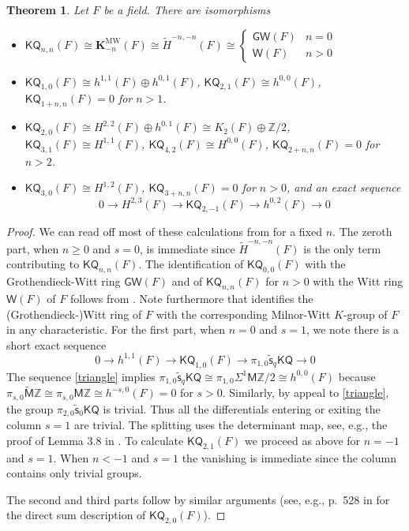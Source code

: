 \documentclass[11pt,hyp,english]{article}
\newcommand{\Z}{\mathbb{Z}}
\newcommand{\KQ}{\mathsf{KQ}}
\newcommand{\GW}{\mathsf{GW}}
\newcommand{\HZ}{\mathsf{M}\Z}
\newcommand{\cHZ}{\wt{{\mathsf{M}}}{\Z}}
\newcommand{\wt}[1]{\widetilde{#1}}
\newcommand{\vs}{\tilde{\mathsf{s}}}
\newcommand{\KMW}{\mathbf{K}^\mathrm{MW}}
\newtheorem{theorem}{Theorem}[section]
\theoremstyle{definition}
\begin{document}
\begin{theorem}\label{thm:KQ-coeff-field}
Let $F$ be a field. 
There are isomorphisms 
\begin{itemize}
\item[0.] 
$\KQ_{n,n}(F)\cong \KMW_{-n}(F) 
\cong
\widetilde{H}^{-n,-n}(F)
\cong
\begin{cases}
\GW(F) & n=0  \\
\mathsf{W}(F) & n>0
\end{cases}
$ 
\item[1.] 
$
\KQ_{1,0}(F)\cong 
h^{1,1}(F)\oplus h^{0,1}(F)
$, 
$
\KQ_{2,1}(F)\cong 
h^{0,0}(F)
$,
$
\KQ_{1+n,n}(F)=
0
$
for $n>1$.
\item[2.] 
$
\KQ_{2,0}(F)\cong 
H^{2,2}(F)\oplus h^{0,1}(F)
\cong
K_{2}(F) \oplus \mathbb{Z}/2
$, 
$
\KQ_{3,1}(F)\cong 
H^{1,1}(F)
$,
$
\KQ_{4,2}(F)\cong 
H^{0,0}(F)
$,
$
\KQ_{2+n,n}(F)=
0
$
for $n>2$.
\item[3.] 
$
\KQ_{3,0}(F)\cong 
H^{1,2}(F)
$,
$
\KQ_{3+n,n}(F)=
0
$
for $n>0$, and an exact sequence
$$
0\to
H^{2,3}(F)
\to
\KQ_{2,-1}(F)
\to
h^{0,2}(F)
\to 0
$$
\end{itemize}
\end{theorem}
\begin{proof}
We can read off most of these calculations from  for a fixed $n$. 
The zeroth part, when $n\geq 0$ and $s=0$, is immediate since $\widetilde{H}^{-n,-n}(F)$ is the only term contributing to $\KQ_{n,n}(F)$.
The identification of $\KQ_{0,0}(F)$ with the Grothendieck-Witt ring $\GW(F)$ and of $\KQ_{n,n}(F)$ for $n>0$ with the Witt ring $\mathsf{W}(F)$ of $F$ follows from \cite[Cor.~1.3.10]{9.III}.
Note furthermore that \cite{deglise2023notesmilnorwittktheory} identifies the (Grothendieck-)Witt ring of $F$ with the corresponding Milnor-Witt $K$-group of $F$ in any characteristic.
For the first part, 
when $n=0$ and $s=1$, 
we note there is a short exact sequence
$$
0 \to
h^{1,1}(F) \to
\KQ_{1,0}(F) \to
\pi_{1,0}\vs_{q}\KQ  \to
0
$$
The sequence \eqref{triangle} implies 
$\pi_{1,0}\vs_{q}\KQ \cong \pi_{1,0}\Sigma^{1}\HZ/2 \cong h^{0,0}(F)$ 
because $\pi_{s,0}\cHZ\cong \pi_{s,0}\HZ \cong h^{-s,0}(F)=0$ for $s>0$.
Similarly, 
by appeal to \eqref{triangle}, 
the group $\pi_{2,0}\vs_{0}\KQ $ is trivial.
Thus all the differentials entering or exiting the column $s=1$ are trivial. 
The splitting uses the determinant map, 
see, e.g., the proof of Lemma 3.8 in \cite{zbMATH05840069}. 
To calculate $\KQ_{2,1}(F)$ we proceed as above for $n=-1$ and $s=1$. 
When $n<-1$ and $s=1$ the vanishing is immediate since the column contains only trivial groups.

The second and third parts follow by similar arguments 
(see, e.g., p.~528 in \cite{zbMATH05840069} for the direct sum description of $\KQ_{2,0}(F)$).
\end{proof}
\end{document}
